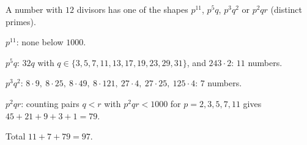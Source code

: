 A number with $12$ divisors has one of the shapes $p^{11}$, $p^5q$, $p^3q^2$ or $p^2qr$ (distinct primes).

$p^{11}$: none below $1000$.

$p^5q$: $32q$ with $q\in\{3,5,7,11,13,17,19,23,29,31\}$, and $243\cdot2$: $11$ numbers.

$p^3q^2$: $8\cdot9,\ 8\cdot25,\ 8\cdot49,\ 8\cdot121,\ 27\cdot4,\ 27\cdot25,\ 125\cdot4$: $7$ numbers.

$p^2qr$: counting pairs $q<r$ with $p^2qr<1000$ for $p=2,3,5,7,11$ gives $45+21+9+3+1=79$.

Total $11+7+79=\boxed{97}$.
